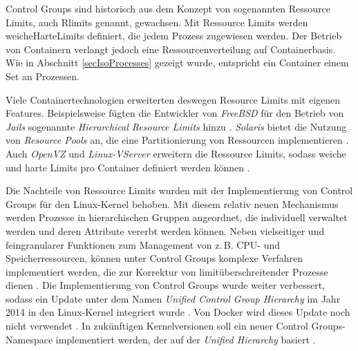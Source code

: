 \documentclass[../main.tex]{subfiles}
\begin{document}
		Control Groups sind historisch aus dem Konzept von sogenannten Ressource Limits, auch Rlimits genannt, gewachsen. Mit Ressource Limits werden \gls{weicheHarteLimits} definiert, die jedem Prozess zugewiesen werden. Der Betrieb von Containern verlangt jedoch eine Ressourcenverteilung auf Containerbasis. Wie in Abschnitt \ref{secIsoProcesses} gezeigt wurde, entspricht ein Container einem Set an Prozessen.


		Viele Containertechnologien erweiterten deswegen Resource Limits mit eigenen Features. Beispielsweise fügten die Entwickler von \emph{FreeBSD} für den Betrieb von \emph{Jails} sogenannte \emph{Hierarchical Resource Limits} hinzu \cite{freeBsdRCTL}. \emph{Solaris} bietet die Nutzung von \emph{Resource Pools} an, die eine Partitionierung von Ressourcen implementieren \cite{cgroupsUniHierarchyDoc}. Auch \emph{OpenVZ} und \emph{Linux-VServer} erweitern die Ressource Limits, sodass weiche und harte Limits pro Container definiert werden können \cite[S.15f.]{dockerSec2}.

		Die Nachteile von Ressource Limits wurden mit der Implementierung von Control Groups für den Linux-Kernel behoben. Mit diesem relativ neuen Mechanismus werden Prozesse in hierarchischen Gruppen angeordnet, die individuell verwaltet werden und deren Attribute vererbt werden können. Neben vielseitiger und feingranularer Funktionen zum Management von z.\,B. CPU- und Speicherressourcen, können unter Control Groups komplexe Verfahren implementiert werden, die zur Korrektur von limitüberschreitender Prozesse dienen \cite{cgroupsRedhat}. Die Implementierung von Control Groups wurde weiter verbessert, sodass ein Update unter dem Namen \emph{Unified Control Group Hierarchy} im Jahr 2014 in den Linux-Kernel integriert wurde \cite{cgroupsFixing}\cite{cgroupsUniHierarchy}. Von Docker wird dieses Update noch nicht verwendet \cite{githubCgroupsUniHierNotSupported}. In zukünftigen Kernelversionen soll ein neuer Control Groups-Namespace implementiert werden, der auf der \emph{Unified Hierarchy} basiert \cite{cgroupNs}.
\end{document}
